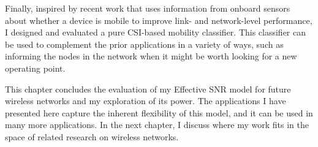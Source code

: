 Finally, inspired by recent work that uses information from onboard sensors about whether a device is mobile to improve link- and network-level performance, I designed and evaluated a pure CSI-based mobility classifier. This classifier can be used to complement the prior applications in a variety of ways, such as informing the nodes in the network when it might be worth looking for a new operating point.

This chapter concludes the evaluation of my Effective SNR model for future wireless networks and my exploration of its power. The applications I have presented here capture the inherent flexibility of this model, and it can be used in many more applications. In the next chapter, I discuss where my work fits in the space of related research on wireless networks.


\ifx\mainfile\undefined

\fi